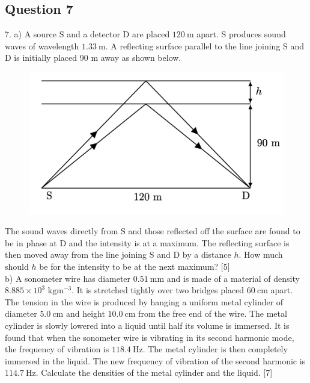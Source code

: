 \documentclass{article}
\begin{document}
\subsection{Question 7}
7. a) A source $\mathrm{S}$ and a detector $\mathrm{D}$ are placed $120 \mathrm{~m}$ apart. S produces sound waves of wavelength $1.33 \mathrm{~m}$. A reflecting surface parallel to the line joining S and D is initially placed 90 $\mathrm{m}$ away as shown below.

\begin{figure}
	\centering
	\includegraphics[width=0.5\linewidth]{spho_book_TYS_images/2019q7.png}
	\caption{}
\end{figure}

The sound waves directly from $\mathrm{S}$ and those reflected off the surface are found to be in phase at $\mathrm{D}$ and the intensity is at a maximum. The reflecting surface is then moved away from the line joining S and D by a distance $h$. How much should $h$ be for the intensity to be at the next maximum? [5] \\ 
b) A sonometer wire has diameter $0.51 \mathrm{~mm}$ and is made of a material of density $8.885 \times 10^{3}$ $\mathrm{kg} \mathrm{m}^{-3}$. It is stretched tightly over two bridges placed $60 \mathrm{~cm}$ apart. The tension in the wire is produced by hanging a uniform metal cylinder of diameter $5.0 \mathrm{~cm}$ and height $10.0 \mathrm{~cm}$ from the free end of the wire. The metal cylinder is slowly lowered into a liquid until half its volume is immersed. It is found that when the sonometer wire is vibrating in its second harmonic mode, the frequency of vibration is $118.4 \mathrm{~Hz}$. The metal cylinder is then completely immersed in the liquid. The new frequency of vibration of the second harmonic is $114.7 \mathrm{~Hz}$. Calculate the densities of the metal cylinder and the liquid. [7]
\end{document}

